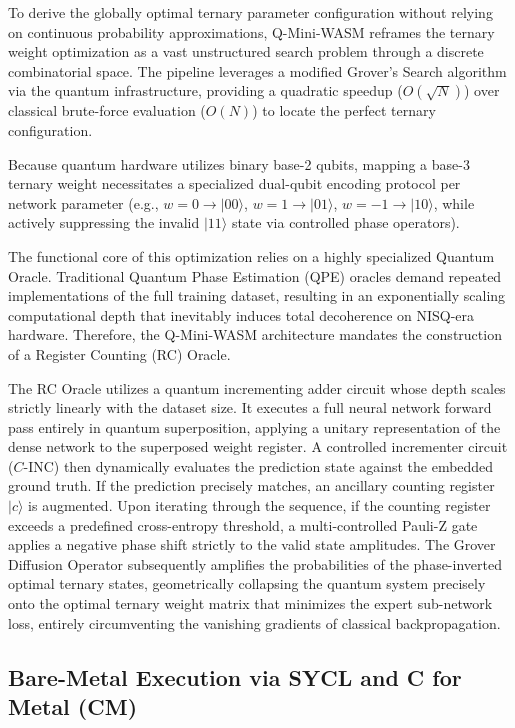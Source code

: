 \documentclass[11pt,a4paper]{article}
\begin{document}
To derive the globally optimal ternary parameter configuration without relying on continuous probability approximations, Q-Mini-WASM reframes the ternary weight optimization as a vast unstructured search problem through a discrete combinatorial space. The pipeline leverages a modified Grover's Search algorithm via the quantum infrastructure, providing a quadratic speedup ($O(\sqrt{N})$) over classical brute-force evaluation ($O(N)$) to locate the perfect ternary configuration.

Because quantum hardware utilizes binary base-2 qubits, mapping a base-3 ternary weight necessitates a specialized dual-qubit encoding protocol per network parameter (e.g., $w=0 \rightarrow |00\rangle$, $w=1 \rightarrow |01\rangle$, $w=-1 \rightarrow |10\rangle$, while actively suppressing the invalid $|11\rangle$ state via controlled phase operators).

The functional core of this optimization relies on a highly specialized Quantum Oracle. Traditional Quantum Phase Estimation (QPE) oracles demand repeated implementations of the full training dataset, resulting in an exponentially scaling computational depth that inevitably induces total decoherence on NISQ-era hardware. Therefore, the Q-Mini-WASM architecture mandates the construction of a Register Counting (RC) Oracle.

The RC Oracle utilizes a quantum incrementing adder circuit whose depth scales strictly linearly with the dataset size. It executes a full neural network forward pass entirely in quantum superposition, applying a unitary representation of the dense network to the superposed weight register. A controlled incrementer circuit ($C$-INC) then dynamically evaluates the prediction state against the embedded ground truth. If the prediction precisely matches, an ancillary counting register $|c\rangle$ is augmented. Upon iterating through the sequence, if the counting register exceeds a predefined cross-entropy threshold, a multi-controlled Pauli-Z gate applies a negative phase shift strictly to the valid state amplitudes. The Grover Diffusion Operator subsequently amplifies the probabilities of the phase-inverted optimal ternary states, geometrically collapsing the quantum system precisely onto the optimal ternary weight matrix that minimizes the expert sub-network loss, entirely circumventing the vanishing gradients of classical backpropagation.

\subsection{Bare-Metal Execution via SYCL and C for Metal (CM)}
\end{document}
